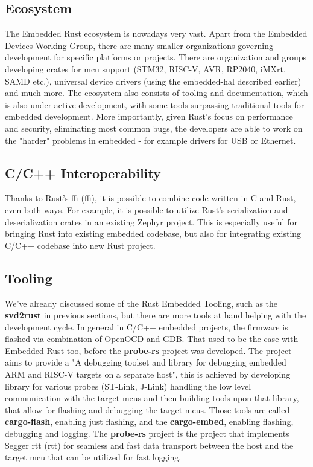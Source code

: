 \subsection{Ecosystem}
\label{subsec:ecosystem}
The Embedded Rust ecosystem is nowadays very vast.
Apart from the Embedded Devices Working Group, there are many smaller organizations governing development for specific platforms or projects.
There are organization and groups developing crates for \acs{mcu} support (STM32, RISC-V, AVR, RP2040, iMXrt, SAMD etc.), universal device drivers (using the embedded-hal described earlier) and much more.
The ecosystem also consists of tooling and documentation, which is also under active development, with some tools surpassing traditional tools for embedded development.
More importantly, given Rust's focus on performance and security, eliminating most common bugs, the developers are able to work on the "harder" problems in embedded - for example drivers for USB\cite{noauthor_stm32-rsstm32-usbd_2021} or Ethernet\cite{noauthor_stm32-rsstm32-eth_2021}.

\subsection{C/C++ Interoperability}
\label{subsec:ccpp_interop}
Thanks to Rust's \acs{ffi} (\acl{ffi}), it is possible to combine code written in C and Rust, even both ways\cite{rust_embedded_devices_wg_interoperability_nodate}.
For example, it is possible to utilize Rust's serialization and deserialization crates in an existing Zephyr project\cite{wolff_embedding_nodate}.
This is especially useful for bringing Rust into existing embedded codebase, but also for integrating existing C/C++ codebase into new Rust project.

\subsection{Tooling}
\label{subsec:tooling}
We've already discussed some of the Rust Embedded Tooling, such as the \textbf{svd2rust} in previous sections, but there are more tools at hand helping with the development cycle.
In general in C/C++ embedded projects, the firmware is flashed via combination of OpenOCD and GDB.
That used to be the case with Embedded Rust too, before the \textbf{probe-rs} project was developed.
The project aims to provide a "A debugging toolset and library for debugging embedded ARM and RISC-V targets on a separate host"\cite{probe_rs_project_probe-rsprobe-rs_2021}, this is achieved by developing library for various probes (ST-Link, J-Link) handling the low level communication with the target \acs{mcu}s and then building tools upon that library, that allow for flashing and debugging the target \acs{mcu}s.
Those tools are called \textbf{cargo-flash}\cite{probe_rs_project_probe-rscargo-flash_2021}, enabling just flashing, and the \textbf{cargo-embed}\cite{probe_rs_project_probe-rscargo-embed_2021}, enabling flashing, debugging and logging.
The \textbf{probe-rs} project is the project that implements Segger \acs{rtt} (\acl{rtt}) for seamless and fast data transport between the host and the target \acs{mcu} that can be utilized for fast logging.

